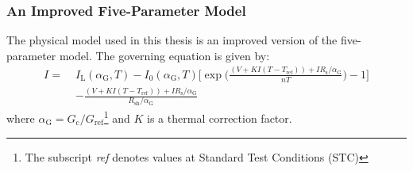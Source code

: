 \begin{frame}
    \frametitle{An Improved Five-Parameter Model}
    The physical model used in this thesis is an improved version of the five-parameter model.
    The governing equation is given by:
    \small
    \begin{align}
        I = \; &I_{\text{L}}(\alpha_{\text{G}}, T) - I_{0}(\alpha_{\text{G}}, T)\Biggl[\exp\biggl(\frac{(V + KI(T - T_{\text{ref}}))+IR_{\text{s}}/\alpha_{\text{G}}}{nT}\biggr) - 1\Biggr] \nonumber \\
                        &- \frac{(V + KI(T - T_{\text{ref}}))+IR_{\text{s}}/\alpha_{\text{G}}}{R_{\text{sh}}/\alpha_{\text{G}}} \nonumber
    \end{align}
    \normalsize
    where \(\alpha_{\text{G}} = G_{\text{c}} / G_{\text{ref}}\)\footnote{The subscript \textit{ref} denotes values at Standard Test Conditions (STC)} and \(K\) is a thermal correction factor. 
\end{frame}
